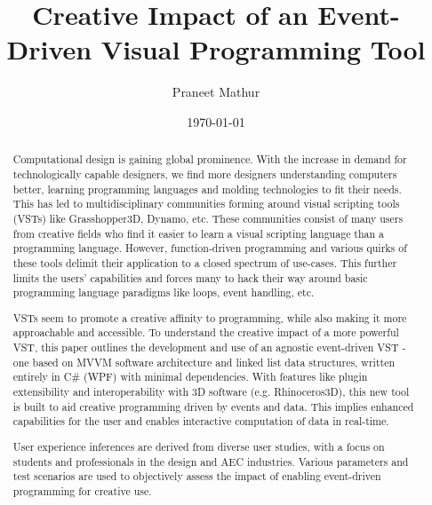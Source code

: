 \documentclass[aps,prb,twocolumn,superscriptaddress,floatfix,longbibliography]{revtex4-2}
\newcounter{para}
\newcommand{\mytitle}{Creative Impact of an Event-Driven Visual Programming Tool}
\begin{document}
\title{\mytitle}

\author{Praneet Mathur}

\date{\today}
 
%
%
%
 
\begin{abstract}
Computational design is gaining global prominence. With the increase in demand for technologically capable designers, we find more designers understanding computers better, learning programming languages and molding technologies to fit their needs. This has led to multidisciplinary communities forming around visual scripting tools (VSTs) like Grasshopper3D, Dynamo, etc. These communities consist of many users from creative fields who find it easier to learn a visual scripting language than a programming language. However, function-driven programming and various quirks of these tools delimit their application to a closed spectrum of use-cases. This further limits the users’ capabilities and forces many to hack their way around basic programming language paradigms like loops, event handling, etc.

VSTs seem to promote a creative affinity to programming, while also making it more approachable and accessible. To understand the creative impact of a more powerful VST, this paper outlines the development and use of an agnostic event-driven VST - one based on MVVM software architecture and linked list data structures, written entirely in C\# (WPF) with minimal dependencies. With features like plugin extensibility and interoperability with 3D software (e.g. Rhinoceros3D), this new tool is built to aid creative programming driven by events and data. This implies enhanced capabilities for the user and enables interactive computation of data in real-time.

User experience inferences are derived from diverse user studies, with a focus on students and professionals in the design and AEC industries. Various parameters and test scenarios are used to objectively assess the impact of enabling event-driven programming for creative use.
\end{abstract}
 
\end{document}
